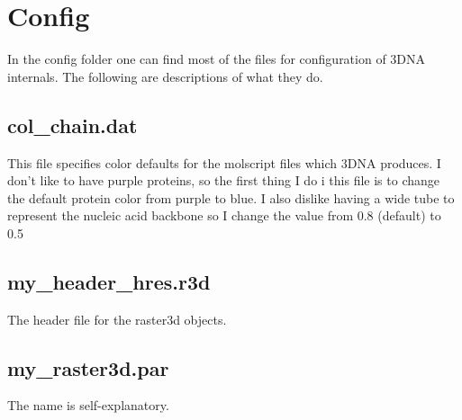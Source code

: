 \section{Config}
In the config folder one can  find most of the files for configuration
of 3DNA internals. The following are descriptions of what they do.

\subsection{col\_chain.dat}
This file specifies color defaults  for the molscript files which 3DNA
produces. I don't  like to have purple proteins, so  the first thing I
do i this  file is to change the default protein  color from purple to
blue. I also dislike having a  wide tube to represent the nucleic acid
backbone so I change the value from 0.8 (default) to 0.5

\subsection{my\_header\_hres.r3d}
The header file for the raster3d objects. 

\subsection{my\_raster3d.par}
The name is self-explanatory.








